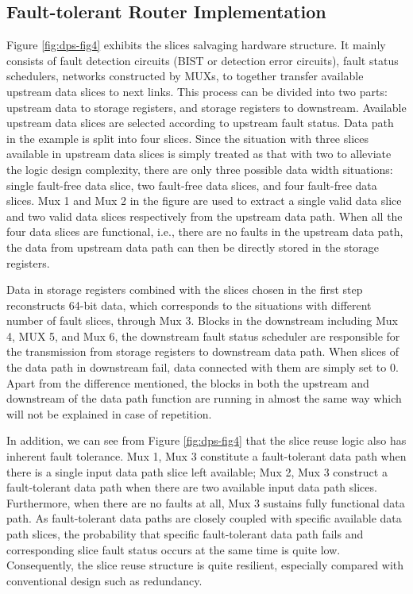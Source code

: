\subsection{Fault-tolerant Router Implementation}
Figure \ref{fig:dps-fig4} exhibits the slices salvaging hardware structure. It mainly consists of fault detection circuits (BIST or detection error circuits), fault status schedulers, networks constructed by MUXs, to together transfer available upstream data slices to next links. This process can be divided into two parts: upstream data to storage registers, and storage registers to downstream. Available upstream data slices are selected according to upstream fault status. Data path in the example is split into four slices. Since the situation with three slices available in upstream data slices is simply treated as that with two to alleviate the logic design complexity, there are only three possible data width situations: single fault-free data slice, two fault-free data slices, and four fault-free data slices. Mux 1 and Mux 2 in the figure are used to extract a single valid data slice and two valid data slices respectively from the upstream data path. When all the four data slices are functional, i.e., there are no faults in the upstream data path, the data from upstream data path can then be directly stored in the storage registers. 

Data in storage registers combined with the slices chosen in the first step reconstructs 64-bit data, which corresponds to the situations with different number of fault slices, through Mux 3. Blocks in the downstream including Mux 4, MUX 5, and Mux 6, the downstream fault status scheduler are responsible for the transmission from storage registers to downstream data path. When slices of the data path in downstream fail, data connected with them are simply set to 0. Apart from the difference mentioned, the blocks in both the upstream and downstream of the data path function are running in almost the same way which will not be explained in case of repetition.

In addition, we can see from Figure \ref{fig:dps-fig4} that the slice reuse logic also has inherent fault tolerance. Mux 1, Mux 3 constitute a fault-tolerant data path when there is a single input data path slice left available; Mux 2, Mux 3 construct a fault-tolerant data path when there are two available input data path slices. Furthermore, when there are no faults at all, Mux 3 sustains fully functional data path. As fault-tolerant data paths are closely coupled with specific available data path slices, the probability that specific fault-tolerant data path fails and corresponding slice fault status occurs at the same time is quite low. Consequently, the slice reuse structure is quite resilient, especially compared with conventional design such as redundancy.

